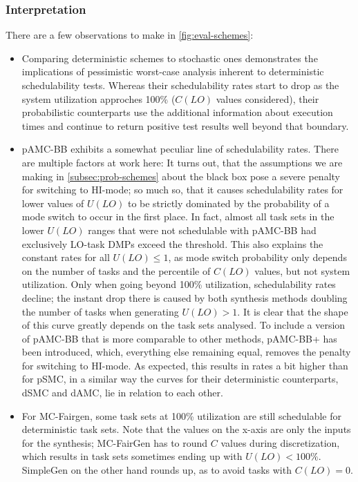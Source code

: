 \documentclass[a4paper,oneside]{csthesis}
\begin{document}
\subsubsection{Interpretation}
There are a few observations to make in \cref{fig:eval-schemes}:
\begin{itemize}
    \item Comparing deterministic schemes to stochastic ones demonstrates the implications of pessimistic worst-case analysis inherent to deterministic schedulability tests. Whereas their schedulability rates start to drop as the system utilization approches 100\% ($C(LO)$ values considered), their probabilistic counterparts use the additional information about execution times and continue to return positive test results well beyond that boundary.
    \item pAMC-BB exhibits a somewhat peculiar line of schedulability rates. There are multiple factors at work here: It turns out, that the assumptions we are making in \cref{subsec:prob-schemes} about the black box pose a severe penalty for switching to HI-mode; so much so, that it causes schedulability rates for lower values of $U(LO)$ to be strictly dominated by the probability of a mode switch to occur in the first place. In fact, almost all task sets in the lower $U(LO)$ ranges that were not schedulable with pAMC-BB had exclusively LO-task DMPs exceed the threshold. This also explains the constant rates for all $U(LO) \leq 1$, as mode switch probability only depends on the number of tasks and the percentile of $C(LO)$ values, but not system utilization. Only when going beyond 100\% utilization, schedulability rates decline; the instant drop there is caused by both synthesis methods doubling the number of tasks when generating $U(LO) > 1$.
    It is clear that the shape of this curve greatly depends on the task sets analysed. To include a version of pAMC-BB that is more comparable to other methods, pAMC-BB+ has been introduced, which, everything else remaining equal, removes the penalty for switching to HI-mode. As expected, this results in rates a bit higher than for pSMC, in a similar way the curves for their deterministic counterparts, dSMC and dAMC, lie in relation to each other.
    \item For MC-Fairgen, some task sets at 100\% utilization are still schedulable for deterministic task sets. Note that the values on the x-axis are only the inputs for the synthesis; MC-FairGen has to round $C$ values during discretization, which results in task sets sometimes ending up with $U(LO) < 100\%$. SimpleGen on the other hand rounds up, as to avoid tasks with $C(LO) = 0$.
\end{itemize}
\end{document}
